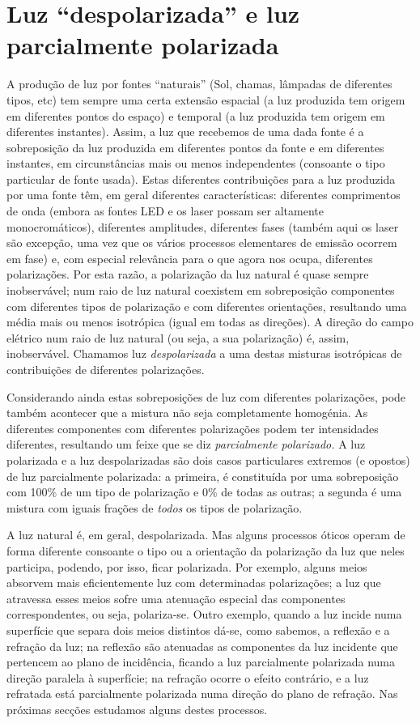 \section{Luz ``despolarizada'' e luz parcialmente polarizada}
A produção de luz por fontes ``naturais'' (Sol, chamas, lâmpadas de diferentes
tipos, etc) tem sempre uma certa extensão espacial (a luz produzida tem origem
em diferentes pontos do espaço) e temporal (a luz produzida tem origem em
diferentes instantes). Assim, a luz que recebemos de uma dada fonte é a
sobreposição da luz produzida em diferentes pontos da fonte e em diferentes
instantes, em circunstâncias mais ou menos independentes (consoante o tipo
particular de fonte usada). Estas diferentes contribuições para a luz produzida
por uma fonte têm, em geral diferentes características: diferentes comprimentos
de onda (embora as fontes LED e os laser possam ser altamente monocromáticos),
diferentes amplitudes, diferentes fases (também aqui os laser são excepção, uma
vez que os vários processos elementares de emissão ocorrem em fase) e, com
especial relevância para o que agora nos ocupa, diferentes polarizações.
Por esta razão, a polarização da luz natural é quase sempre inobservável; num
raio de luz natural coexistem em sobreposição componentes com diferentes tipos
de polarização e com diferentes orientações, resultando uma média mais ou menos
isotrópica (igual em todas as direções). A direção do campo elétrico num raio de
luz natural (ou seja, a sua polarização) é, assim, inobservável. Chamamos luz
\emph{despolarizada} a uma destas misturas isotrópicas de contribuições de
diferentes polarizações.

Considerando ainda estas sobreposições de luz com diferentes polarizações, pode
também acontecer que a mistura não seja completamente homogénia. As diferentes
componentes com diferentes polarizações podem ter intensidades diferentes,
resultando um feixe que se diz \emph{parcialmente polarizado.} A luz polarizada
e a luz despolarizadas são dois casos particulares extremos (e opostos) de luz
parcialmente polarizada: a primeira, é constituída por uma sobreposição com
100\% de um tipo de polarização e 0\% de todas as outras; a segunda é uma
mistura com iguais frações de \emph{todos} os tipos de polarização.

A luz natural é, em geral, despolarizada. Mas alguns processos óticos operam de
forma diferente consoante o tipo ou a orientação da polarização da luz que neles
participa, podendo, por isso, ficar polarizada. Por exemplo, alguns meios
absorvem mais eficientemente luz com determinadas polarizações; a luz que
atravessa esses meios sofre uma atenuação especial das componentes
correspondentes, ou seja, polariza-se.  Outro exemplo, quando a luz incide numa
superfície que separa dois meios distintos dá-se, como sabemos, a reflexão e a
refração da luz; na reflexão são atenuadas as componentes da luz incidente que
pertencem ao plano de incidência, ficando a luz parcialmente polarizada numa
direção paralela à superfície; na refração ocorre o efeito contrário, e a luz
refratada está parcialmente polarizada numa direção do plano de refração.  Nas
próximas secções estudamos alguns destes processos.

